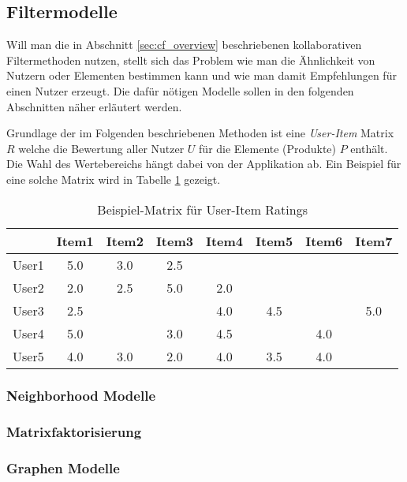 \subsection{Filtermodelle}
\label{sec:filtermethods}

Will man die in Abschnitt \ref{sec:cf_overview} beschriebenen kollaborativen Filtermethoden nutzen, stellt sich das Problem wie man die Ähnlichkeit von Nutzern oder Elementen bestimmen kann und wie man damit Empfehlungen für einen Nutzer erzeugt. Die dafür nötigen Modelle sollen in den folgenden Abschnitten näher erläutert werden.

Grundlage der im Folgenden beschriebenen Methoden ist eine \textit{User-Item} Matrix $R$ welche die Bewertung aller Nutzer $U$ für die Elemente (Produkte) $P$ enthält. Die Wahl des Wertebereichs hängt dabei von der Applikation ab. Ein Beispiel für eine solche Matrix wird in Tabelle \ref{tab:user-item-ratings} gezeigt.

\begin{table}
  \centering
  \begin{tabular}{ | l || c | c | c | c | c | c | c | }
    \hline
           & Item1 & Item2 & Item3 & Item4 & Item5 & Item6 & Item7 \\ \hline
User1 &    5.0 & 3.0      & 2.5     &            & & & \\				
User2 &    2.0 & 2.5      & 5.0     &  2.0    & & & \\
User3 & 2.5	& & &	4.0 &	 4.5	& &	5.0 \\
User4 & 5.0	& &	3.0	& 4.5 & &	4.0 &	 \\
User5 & 4.0	&3.0 &	2.0 &	4.0 &  3.5 & 4.0	& \\
    \hline
  \end{tabular}
  \caption{Beispiel-Matrix für User-Item Ratings}
  \label{tab:user-item-ratings}
\end{table}



\subsubsection{Neighborhood Modelle}\newpage


\subsubsection{Matrixfaktorisierung}\newpage


\subsubsection{Graphen Modelle}\newpage
